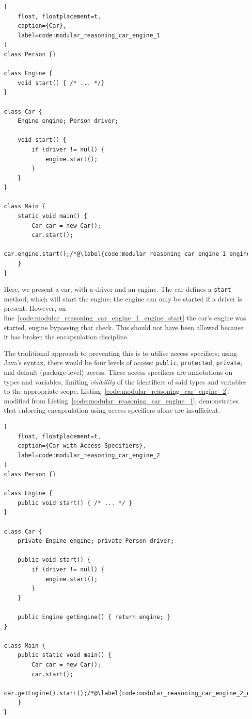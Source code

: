 \documentclass{acm_proc_article-sp}
\begin{document}
\begin{lstlisting}[
	float, floatplacement=t,
	caption={Car},
	label=code:modular_reasoning_car_engine_1
]
class Person {}

class Engine {
	void start() { /* ... */}
}

class Car {
	Engine engine; Person driver;

	void start() {
		if (driver != null) {
			engine.start();
		}
	}
}

class Main {
	static void main() {
		Car car = new Car();
		car.start();
		car.engine.start();/*@\label{code:modular_reasoning_car_engine_1_engine_start}@*/
	}
}
\end{lstlisting}

Here, we present a car, with a driver and an engine. The car defines a 
\lstinline|start| method, which will start the engine; the engine can 
only be started if a driver is present. However, on 
line~\ref{code:modular_reasoning_car_engine_1_engine_start} the car's engine 
was started, engine bypassing that check. This should not have been allowed 
because it has broken the encapsulation discipline.

The traditional approach to preventing this is to utilise access specifiers; 
using Java's syntax, there would be four levels of access: \lstinline|public|, 
\lstinline|protected|, \lstinline|private|, and default (package-level) access. 
These access specifiers are annotations on types and variables, limiting 
\emph{visibility} of the identifiers of said types and variables to the 
appropriate scope. Listing~\ref{code:modular_reasoning_car_engine_2}, modified 
from Listing~\ref{code:modular_reasoning_car_engine_1}, demonstrates that 
enforcing encapsulation using access specifiers alone are insufficient.

\begin{lstlisting}[
	float, floatplacement=t,
	caption={Car with Access Specifiers},
	label=code:modular_reasoning_car_engine_2
]
class Person {}

class Engine {
	public void start() { /* ... */ }
}

class Car {
	private Engine engine; private Person driver;
	
	public void start() {
		if (driver != null) {
			engine.start();
		}
	}

	public Engine getEngine() { return engine; }
}

class Main {
	public static void main() {
		Car car = new Car();
		car.start();
		car.getEngine().start();/*@\label{code:modular_reasoning_car_engine_2_engine_start}@*/
	}
}

\end{lstlisting}
\end{document}
